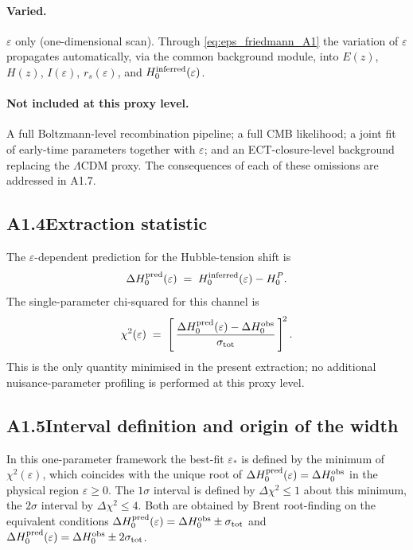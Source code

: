 \paragraph{Varied.}
$\varepsilon$ only (one-dimensional scan). Through
\eqref{eq:eps_friedmann_A1} the variation of $\varepsilon$
propagates automatically, via the common background module, into
$E(z)$, $H(z)$, $I(\varepsilon)$, $r_s(\varepsilon)$, and
$H_0^{\rm inferred}(\varepsilon)$.

\paragraph{Not included at this proxy level.}
A full Boltzmann-level recombination pipeline; a full CMB
likelihood; a joint fit of early-time parameters together with
$\varepsilon$; and an ECT-closure-level background replacing the
$\Lambda$CDM proxy. The consequences of each of these omissions
are addressed in A1.7.

\subsection*{A1.4\quad Extraction statistic}

The $\varepsilon$-dependent prediction for the Hubble-tension shift
is
\begin{equation}
\Delta H_0^{\rm pred}(\varepsilon)
\;=\; H_0^{\rm inferred}(\varepsilon) - H_0^P.
\end{equation}
The single-parameter chi-squared for this channel is
\begin{equation}
\chi^2(\varepsilon)
\;=\;
\left[\,
\frac{\Delta H_0^{\rm pred}(\varepsilon) - \Delta H_0^{\rm obs}}
     {\sigma_{\rm tot}}
\,\right]^{\!2}.
\label{eq:chi2_hubble_eps}
\end{equation}
This is the only quantity minimised in the present extraction; no
additional nuisance-parameter profiling is performed at this proxy
level.

\subsection*{A1.5\quad Interval definition and origin of the width}

In this one-parameter framework the best-fit $\varepsilon_*$ is
defined by the minimum of $\chi^2(\varepsilon)$, which coincides
with the unique root of $\Delta H_0^{\rm pred}(\varepsilon) =
\Delta H_0^{\rm obs}$ in the physical region $\varepsilon \geq 0$.
The $1\sigma$ interval is defined by $\Delta\chi^2 \leq 1$ about
this minimum, the $2\sigma$ interval by $\Delta\chi^2 \leq 4$.
Both are obtained by Brent root-finding on the equivalent
conditions
$\Delta H_0^{\rm pred}(\varepsilon) =
\Delta H_0^{\rm obs} \pm \sigma_{\rm tot}$
and
$\Delta H_0^{\rm pred}(\varepsilon) =
\Delta H_0^{\rm obs} \pm 2\sigma_{\rm tot}$.

